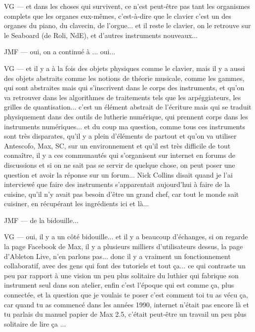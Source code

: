 VG — et dans les choses qui survivent, ce n'est peut-être pas tant les organismes complets que les organes eux-mêmes, c'est-à-dire que le clavier c'est un des organes du piano, du clavecin, de l'orgue... et il reste le clavier, on le retrouve sur le Seaboard (de Roli, NdE), et d'autres instruments nouveaux... 

JMF — oui, on a continué à ... oui... 

VG — et il y a à la fois des objets physiques comme le clavier, mais il y a aussi des objets abstraits comme les notions de théorie musicale, comme les gammes, qui sont abstraites mais qui s'inscrivent dans le corps des instruments, et qu'on va retrouver dans les algorithmes de traitements tels que les arpéggiateurs, les grilles de quantisation... c'est un élément abstrait de l'écriture mais qui se traduit physiquement dans des outils de lutherie numérique, qui prennent corps dans les instruments numériques... et du coup ma question, comme tous ces instruments sont très disparates, qu'il y a plein d'éléments de partout et qu'on va utiliser Antescofo, Max, SC, sur un environnement et qu'il est très difficile de tout connaître, il y a ces communautés qui s'organisent sur internet en forums de discussions et si on ne sait pas se servir de quelque chose, on peut poser une question et avoir la réponse sur un forum... Nick Collins disait quand je l'ai interviewé que faire des instruments s'apparentait aujourd'hui à faire de la cuisine, qu'il n'y avait pas besoin d'être un grand chef, car tout le monde sait cuisiner, en récupérant les ingrédients ici et là... 

JMF — de la bidouille... 

VG — oui, il y a un côté bidouille... et il y a beaucoup d'échanges, si on regarde la page Facebook de Max, il y a plusieurs milliers d'utilisateurs dessus, la page d'Ableton Live, n'en parlons pas... donc il y a vraiment un fonctionnement collaboratif, avec des gens qui font des tutoriels et tout ça... ce qui contraste un peu par rapport à une vision un peu plus solitaire du luthier qui fabrique son instrument seul dans son atelier, enfin c'est l'époque qui est comme ça, plus connectée, et la question que je voulais te poser c'est comment toi tu as vécu ça, car quand tu as commencé dans les années 1990, internet n'était pas encore là et tu parlais du manuel papier de Max 2.5, c'était peut-être un travail un peu plus solitaire de lire ça ... 

